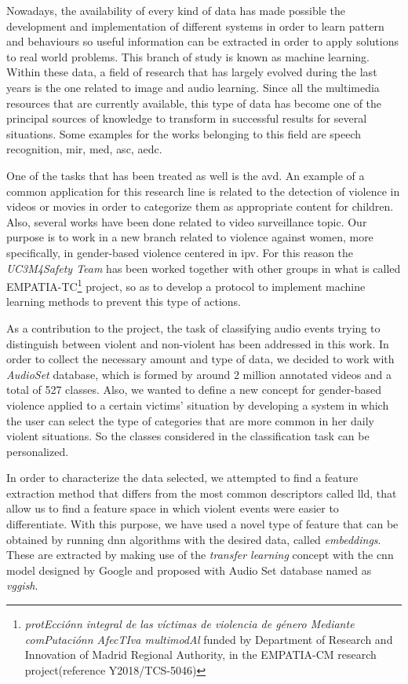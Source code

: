	Nowadays, the availability of every kind of data has made possible the development and implementation of different systems in order to learn pattern and behaviours so useful information can be extracted in order to apply solutions to real world problems. This branch of study is known as machine learning. Within these data, a field of research that has largely evolved during the last years is the one related to image and audio learning. Since all the multimedia resources that are currently available, this type of data has become one of the principal sources of knowledge to transform in successful results for several situations. Some examples for the works belonging to this field are speech recognition, \acrfull{mir}, \acrfull{med}, \acrfull{asc}, \acrfull{aedc}.
	
	One of the tasks that has been treated as well is the \acrfull{avd}. An example of a common application for this research line is related to the detection of violence in videos or movies in order to categorize them as appropriate content for children. Also, several works have been done related to video surveillance topic. Our purpose is to work in a new branch related to violence against women, more specifically, in gender-based violence centered in \acrfull{ipv}. For this reason the \textit{UC3M4Safety Team} has been worked together with other groups in what is called EMPATIA-TC\footnote{\textit{protEcciónn integral de las víctimas de violencia de género Mediante comPutaciónn AfecTIva multimodAl} funded by Department  of  Research  and Innovation of Madrid Regional Authority, in the EMPATIA-CM research project(reference  Y2018/TCS-5046)} project, so as to develop a protocol to implement machine learning methods to prevent this type of actions. 
	
	As a contribution to the project, the task of classifying audio events trying to distinguish between violent and non-violent has been addressed in this work. In order to collect the necessary amount and type of data, we decided to work with \textit{AudioSet} database, which is formed by around 2 million annotated videos and a total of 527 classes. Also, we wanted to define a new concept for gender-based violence applied to a certain victims' situation by developing a system in which the user can select the type of categories that are more common in her daily violent situations. So the classes considered in the classification task can be personalized. 
	
	In order to characterize the data selected, we attempted to find a feature extraction method that differs from the most common descriptors called \acrfull{lld}, that allow us to find a feature space in which violent events were easier to differentiate. With this purpose, we have used a novel type of feature that can be obtained by running \acrshort{dnn} algorithms with the desired data, called \textit{embeddings}. These are extracted by making use of the \textit{transfer learning} concept with the \acrshort{cnn} model designed by Google and proposed with Audio Set database named as \textit{\acrshort{vgg}ish}.
	
